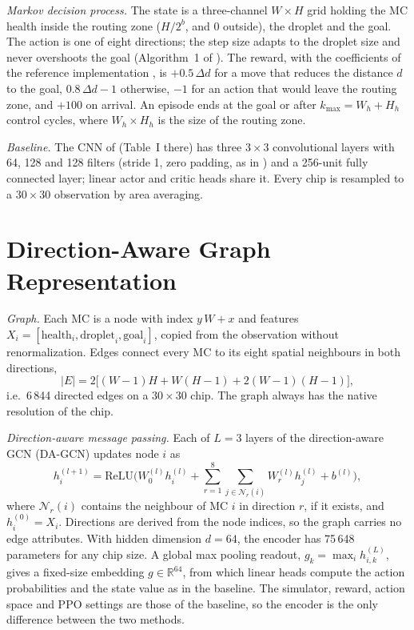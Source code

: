 \documentclass[conference,onecolumn,11pt]{IEEEtran}
\begin{document}
\textit{Markov decision process.} The state is a three-channel $W\times H$ grid holding the
MC health inside the routing zone ($H/2^{b}$, and 0 outside), the droplet and the goal. The
action is one of eight directions; the step size adapts to the droplet size and never
overshoots the goal (Algorithm~1 of \cite{elfar2023}). The reward, with the coefficients of
the reference implementation \cite{elfarcode}, is $+0.5\,\Delta d$ for a move that reduces
the distance $d$ to the goal, $0.8\,\Delta d-1$ otherwise, $-1$ for an action that would
leave the routing zone, and $+100$ on arrival. An episode ends at the goal or after
$k_{\max}=W_h+H_h$ control cycles, where $W_h\times H_h$ is the size of the routing zone.

\textit{Baseline.} The CNN of \cite{elfar2023} (Table~I there) has three $3\times3$
convolutional layers with 64, 128 and 128 filters (stride 1, zero padding, as in
\cite{elfarcode}) and a 256-unit fully connected layer; linear actor and critic heads share
it. Every chip is resampled to a $30\times30$ observation by area averaging.

\section{Direction-Aware Graph Representation}
\textit{Graph.} Each MC is a node with index $y\,W+x$ and features
$X_i=[\text{health}_i,\text{droplet}_i,\text{goal}_i]$, copied from the observation without
renormalization. Edges connect every MC to its eight spatial neighbours in both directions,
\begin{equation}
|E| = 2\big[(W-1)H + W(H-1) + 2(W-1)(H-1)\big],
\end{equation}
i.e.\ 6\,844 directed edges on a $30\times30$ chip. The graph always has the native
resolution of the chip.

\textit{Direction-aware message passing.} Each of $L=3$ layers of the direction-aware GCN
(DA-GCN) updates node $i$ as
\begin{equation}
  h_i^{(l+1)} = \mathrm{ReLU}\Big(W_0^{(l)} h_i^{(l)} + \sum_{r=1}^{8}\sum_{j\in\mathcal{N}_r(i)} W_r^{(l)} h_j^{(l)} + b^{(l)}\Big),
\end{equation}
where $\mathcal{N}_r(i)$ contains the neighbour of MC $i$ in direction $r$, if it exists,
and $h_i^{(0)}=X_i$. Directions are derived from the node indices, so the graph carries no
edge attributes. With hidden dimension $d=64$, the encoder has 75\,648 parameters for any
chip size. A global max pooling readout, $g_k=\max_i h_{i,k}^{(L)}$, gives a fixed-size
embedding $g\in\mathbb{R}^{64}$, from which linear heads compute the action probabilities
and the state value as in the baseline. The simulator, reward, action space and PPO settings
are those of the baseline, so the encoder is the only difference between the two methods.
\end{document}
